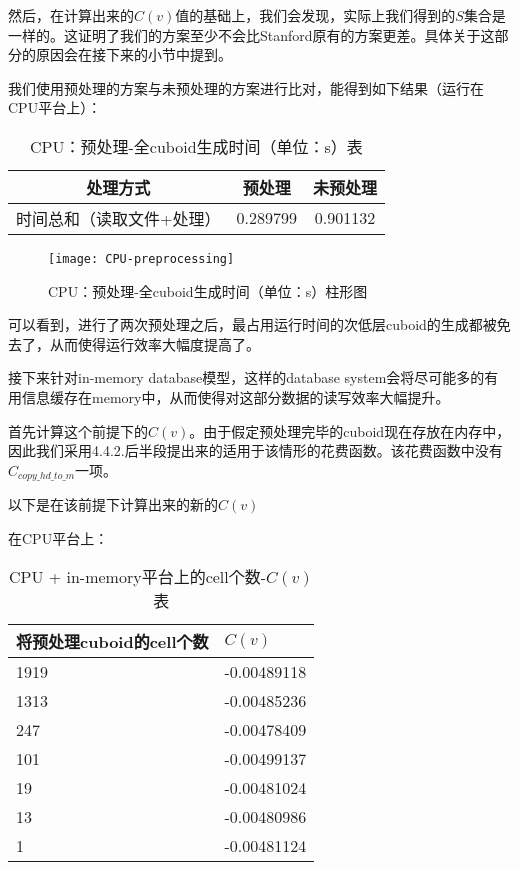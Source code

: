 然后，在计算出来的$C(v)$值的基础上，我们会发现，实际上我们得到的$S$集合是一样的。这证明了我们的方案至少不会比Stanford原有的方案更差。具体关于这部分的原因会在接下来的小节中提到。

我们使用预处理的方案与未预处理的方案进行比对，能得到如下结果（运行在CPU平台上）：

\begin{table}[!htbp]
\centering
\caption{CPU：预处理-全cuboid生成时间（单位：s）表} 
\label{tab:table15}
\begin{tabular}{|c|c|c|}
    \hline
    处理方式 & 预处理 & 未预处理\\
    \hline
    时间总和（读取文件+处理） & 0.289799 & 0.901132\\
    \hline
\end{tabular}
\end{table}

\begin{figure}[ht]
\centering
\texttt{[image: CPU-preprocessing]}
\caption{CPU：预处理-全cuboid生成时间（单位：s）柱形图} 
\label{fig:figure7}
\end{figure}

可以看到，进行了两次预处理之后，最占用运行时间的次低层cuboid的生成都被免去了，从而使得运行效率大幅度提高了。

接下来针对in-memory database模型，这样的database system会将尽可能多的有用信息缓存在memory中，从而使得对这部分数据的读写效率大幅提升。

首先计算这个前提下的$C(v)$。由于假定预处理完毕的cuboid现在存放在内存中，因此我们采用4.4.2.后半段提出来的适用于该情形的花费函数。该花费函数中没有$C_{copy\_hd\_to\_m}$一项。

以下是在该前提下计算出来的新的$C(v)$

在CPU平台上：

\begin{table}[!htbp]
\centering
\caption{CPU + in-memory平台上的cell个数-$C(v)$表} 
\label{tab:table16}
\begin{tabular}{|l|l|}
    \hline
    将预处理cuboid的cell个数 & $C(v)$\\
    \hline
    1919 & -0.00489118\\
    \hline
    1313 & -0.00485236\\
    \hline
    247 & -0.00478409\\
    \hline
    101 & -0.00499137\\
    \hline
    19 & -0.00481024\\
    \hline
    13 & -0.00480986\\
    \hline
    1 & -0.00481124\\
    \hline
\end{tabular}
\end{table}

